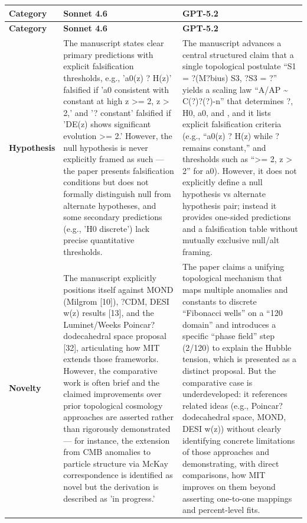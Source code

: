 \documentclass[11pt]{article}
\begin{document}
\begin{longtable}{@{} p{2.2cm} p{6.3cm} p{6.3cm} @{}}
\toprule
\textbf{Category} & \textbf{Sonnet 4.6} & \textbf{GPT-5.2} \\
\midrule
\endfirsthead
\toprule
\textbf{Category} & \textbf{Sonnet 4.6} & \textbf{GPT-5.2} \\
\midrule
\endhead
\bottomrule
\endlastfoot

\rowcolor{rowgray}
\textbf{Hypothesis} &
The manuscript states clear primary predictions with explicit falsification thresholds, e.g., 'a0(z) ? H(z)' falsified if 'a0 consistent with constant at high z \textgreater{}= 2\textsigma{}, z > 2,' and '? constant' falsified if '\textrho{}DE(z) shows significant evolution \textgreater{}= 2\textsigma{}.' However, the null hypothesis is never explicitly framed as such --- the paper presents falsification conditions but does not formally distinguish null from alternate hypotheses, and some secondary predictions (e.g., 'H0 discrete') lack precise quantitative thresholds. &
The manuscript advances a central structured claim that a single topological postulate ``S1 = ?(M?bius) \textrightarrow{} S3, ?S3 = ?'' yields a scaling law ``A/AP \textasciitilde{} C(?)?(?\textOmega{})-n'' that determines ?, H0, a0, and \textalpha{}, and it lists explicit falsification criteria (e.g., ``a0(z) ? H(z) while ? remains constant,'' and thresholds such as ``\textgreater{}= 2\textsigma{}, z > 2'' for a0). However, it does not explicitly define a null hypothesis vs alternate hypothesis pair; instead it provides one-sided predictions and a falsification table without mutually exclusive null/alt framing. \\[6pt]

\textbf{Novelty} &
The manuscript explicitly positions itself against MOND (Milgrom [10]), ?CDM, DESI w(z) results [13], and the Luminet/Weeks Poincar? dodecahedral space proposal [32], articulating how MIT extends those frameworks. However, the comparative work is often brief and the claimed improvements over prior topological cosmology approaches are asserted rather than rigorously demonstrated --- for instance, the extension from CMB anomalies to particle structure via McKay correspondence is identified as novel but the derivation is described as 'in progress.' &
The paper claims a unifying topological mechanism that maps multiple anomalies and constants to discrete ``Fibonacci wells'' on a ``120 domain'' and introduces a specific ``phase field'' step (2/120) to explain the Hubble tension, which is presented as a distinct proposal. But the comparative case is underdeveloped: it references related ideas (e.g., Poincar? dodecahedral space, MOND, DESI w(z)) without clearly identifying concrete limitations of those approaches and demonstrating, with direct comparisons, how MIT improves on them beyond asserting one-to-one mappings and percent-level fits. \\[6pt]


\end{longtable}
\end{document}

